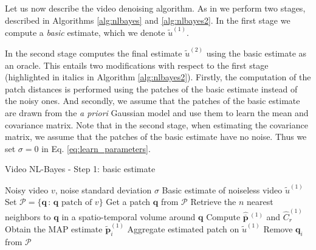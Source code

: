 \documentclass[10pt, journal, twocolumn, final, a4paper]{IEEEtran}
\newcommand{\ma}[1]{\boldsymbol{#1}}
\begin{document}
Let us now describe the video denoising algorithm. As in
\cite{Dabov2007tip,Dabov2007v,Maggioni2012,Lebrun2013a} we perform two stages, described in 
Algorithms \ref{alg:nlbayes} and \ref{alg:nlbayes2}. In the first stage we
compute a \emph{basic} estimate, which we denote $\widetilde u^{(1)}$. 

In the second stage computes the final estimate $\widetilde u^{(2)}$ using the
basic estimate as an oracle. This entails two modifications with respect to the
first stage (highlighted in italics in Algorithm \ref{alg:nlbayes2}). Firstly, the
computation of the patch distances is performed using the patches of the basic
estimate instead of the noisy ones. And secondly, we assume that the patches of
the basic estimate are drawn from the \textit{a priori} Gaussian model and use
them to learn the mean and covariance matrix. Note that in the second stage,
when estimating the covariance matrix, we assume that the patches of the basic
estimate have no noise. Thus we set $\sigma = 0$ in Eq.
\eqref{eq:learn_parameters}.

\begin{algorithm}
	\caption{Video NL-Bayes - Step 1: basic estimate}
	\label{alg:nlbayes}
		\begin{algorithmic}[1]
		\REQUIRE Noisy video $v$, noise standard deviation
		$\sigma$
		\ENSURE Basic estimate of noiseless video $\widetilde u^{(1)}$
		\STATE Set $\mathcal P = \{\ma q \,:\, \ma q \text{ patch of }  v\}$ 
		\STATE Get a patch $\ma q$ from $\mathcal P$ 
			\STATE Retrieve  the $n$ nearest neighbors to $\ma
			q$ in a spatio-temporal volume around $\ma q$
			\STATE Compute $\widehat{\overline{\ma p}}\,\!^{(1)}$ and
			$\widehat C_{r}^{(1)}$ 
			\FORALL{$n$ neighbors $\ma q_i$ of $\ma q$}
				\STATE Obtain the MAP estimate $\widetilde{\ma p}_i^{(1)}$
				\STATE Aggregate estimated patch on $\widetilde u^{(1)}$
				\STATE Remove $\ma q_i$ from $\mathcal P$
			\ENDFOR
		\ENDWHILE
	\end{algorithmic}
\end{algorithm}
\end{document}
